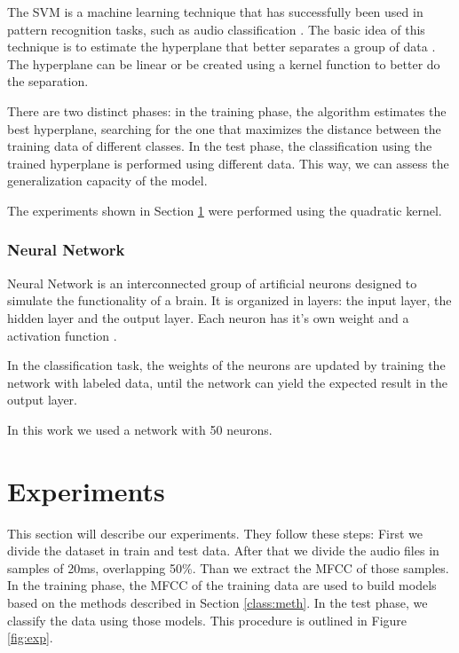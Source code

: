 \documentclass[12pt]{article}
\begin{document}
The SVM is a machine learning technique that has successfully been used in pattern recognition tasks, such as audio classification \cite{dhanalakshmi2009classification}. The basic idea of this technique is to estimate the hyperplane that better separates a group of data \cite{cumani2012analysis}. The hyperplane can be linear or be created using a kernel function to better do the separation.

There are two distinct phases: in the training phase, the algorithm estimates the best hyperplane, searching for the one that maximizes the distance between the training data of different classes. In the test phase, the classification using the trained hyperplane is performed using different data. This way, we can assess the generalization capacity of the model.

The experiments shown in Section \ref{exp} were performed using the quadratic kernel.%


\subsubsection{Neural Network} \label{class:nn}


Neural Network is an interconnected group of artificial neurons designed to simulate the functionality of a brain. It is organized in layers: the input layer, the hidden layer and the output layer. Each neuron has it's own weight and a activation function \cite{wu2007leaf}. 

In the classification task, the weights of the neurons are updated by training the network with labeled data, until the network can yield the expected result in the output layer.

In this work we used a network with 50 neurons.%


\section{Experiments} \label{exp}

This section will describe our experiments. They follow these steps: First we divide the dataset in train and test data. After that we divide the audio files in samples of 20ms, overlapping 50\%. Than we extract the MFCC of those samples. In the training phase, the MFCC of the training data are used to build models based on the methods described in Section \ref{class:meth}. In the test phase, we classify the data using those models. This procedure is outlined in Figure \ref{fig:exp}.
\end{document}
